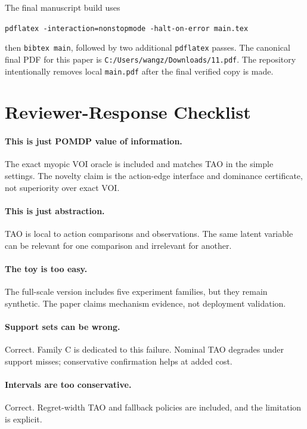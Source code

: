 \documentclass{article}
\begin{document}
The final manuscript build uses
\begin{center}
\texttt{pdflatex -interaction=nonstopmode -halt-on-error main.tex}
\end{center}
then \texttt{bibtex main}, followed by two additional \texttt{pdflatex} passes. The canonical final PDF for this paper is \texttt{C:/Users/wangz/Downloads/11.pdf}. The repository intentionally removes local \texttt{main.pdf} after the final verified copy is made.

\section{Reviewer-Response Checklist}

\paragraph{This is just POMDP value of information.}
The exact myopic VOI oracle is included and matches TAO in the simple settings. The novelty claim is the action-edge interface and dominance certificate, not superiority over exact VOI.

\paragraph{This is just abstraction.}
TAO is local to action comparisons and observations. The same latent variable can be relevant for one comparison and irrelevant for another.

\paragraph{The toy is too easy.}
The full-scale version includes five experiment families, but they remain synthetic. The paper claims mechanism evidence, not deployment validation.

\paragraph{Support sets can be wrong.}
Correct. Family C is dedicated to this failure. Nominal TAO degrades under support misses; conservative confirmation helps at added cost.

\paragraph{Intervals are too conservative.}
Correct. Regret-width TAO and fallback policies are included, and the limitation is explicit.
\end{document}
